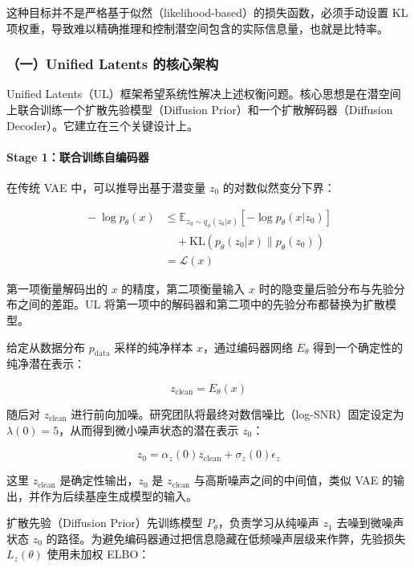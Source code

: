 这种目标并不是严格基于似然（likelihood-based）的损失函数，必须手动设置 KL 项权重，导致难以精确推理和控制潜空间包含的实际信息量，也就是比特率。

\hypertarget{ux4e00unified-latents-ux7684ux6838ux5fc3ux67b6ux6784}{%
\subsubsection{（一）Unified Latents 的核心架构}\label{ux4e00unified-latents-ux7684ux6838ux5fc3ux67b6ux6784}}

Unified Latents（UL）框架希望系统性解决上述权衡问题。核心思想是在潜空间上联合训练一个扩散先验模型（Diffusion Prior）和一个扩散解码器（Diffusion Decoder）。它建立在三个关键设计上。

\hypertarget{stage-1ux8054ux5408ux8badux7ec3ux81eaux7f16ux7801ux5668}{%
\paragraph{Stage 1：联合训练自编码器}\label{stage-1ux8054ux5408ux8badux7ec3ux81eaux7f16ux7801ux5668}}

在传统 VAE 中，可以推导出基于潜变量 \(z_0\) 的对数似然变分下界：

\[
\begin{aligned}
{}-\log p_\theta(x)
&\le
\mathbb{E}_{z_0\sim q_\phi(z_0|x)}
\left[-\log p_\theta(x|z_0)\right]
\\
&\quad +
\mathrm{KL}(p_\theta(z_0|x)\|p_\theta(z_0))
\\
&=
\mathcal{L}(x)
\end{aligned}
\]

第一项衡量解码出的 \(x\) 的精度，第二项衡量输入 \(x\) 时的隐变量后验分布与先验分布之间的差距。UL 将第一项中的解码器和第二项中的先验分布都替换为扩散模型。

给定从数据分布 \(p_{\mathrm{data}}\) 采样的纯净样本 \(x\)，通过编码器网络 \(E_\theta\) 得到一个确定性的纯净潜在表示：

\[
z_{\mathrm{clean}}=E_\theta(x)
\]

随后对 \(z_{\mathrm{clean}}\) 进行前向加噪。研究团队将最终对数信噪比（log-SNR）固定设定为 \(\lambda(0)=5\)，从而得到微小噪声状态的潜在表示 \(z_0\)：

\[
z_0=\alpha_z(0)z_{\mathrm{clean}}+\sigma_z(0)\epsilon_z
\]

这里 \(z_{\mathrm{clean}}\) 是确定性输出，\(z_0\) 是 \(z_{\mathrm{clean}}\) 与高斯噪声之间的中间值，类似 VAE 的输出，并作为后续基座生成模型的输入。

扩散先验（Diffusion Prior）先训练模型 \(P_\theta\)，负责学习从纯噪声 \(z_1\) 去噪到微噪声状态 \(z_0\) 的路径。为避免编码器通过把信息隐藏在低频噪声层级来作弊，先验损失 \(L_z(\theta)\) 使用未加权 ELBO：

